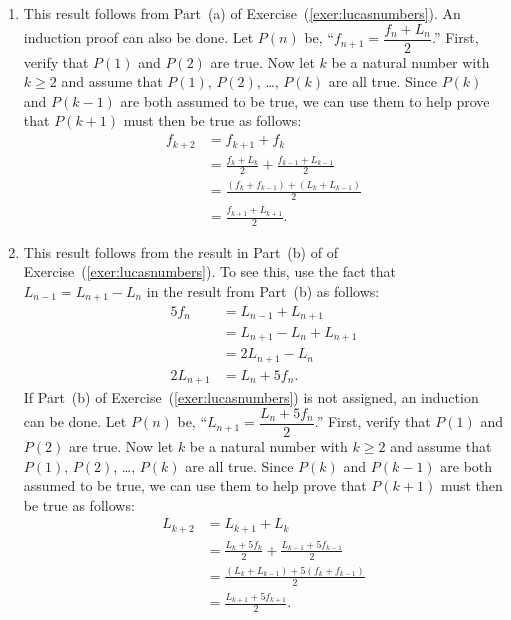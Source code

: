 \begin{enumerate}
\begin{enumerate}
\item This result follows from Part~(a) of Exercise~(\ref{exer:lucasnumbers}).  An induction proof can also be done.  Let $P(n)$ be, 
``$f_{n+1} = \dfrac{f_n + L_n}{2}$.''  First, verify that $P(1)$ and $P(2)$ are true.  Now let 
$k$ be a natural number with $k \geq 2$ and assume that $P(1)$, $P(2)$, \ldots, 
$P(k)$ are all true. Since $P(k)$ and $P(k-1)$ are both assumed to be true, we can use them to help prove that $P(k+1)$ must then be true as follows:
\begin{align*}
f_{k + 2} &= f_{k+1} + f_k \\
          &= \frac{f_k + L_k}{2} + \frac{f_{k-1} + L_{k-1}}{2} \\
          &= \frac{\left( f_k + f_{k-1} \right) + \left( L_k + L_{k-1} \right)}{2} \\
          &= \frac{f_{k+1} + L_{k+1}}{2}.
\end{align*}


\item This result follows from the result in Part~(b) of of Exercise~(\ref{exer:lucasnumbers}).  To see this, use the fact that 
$L_{n-1} = L_{n+1} - L_n$ in the result from Part~(b) as follows:
\begin{align*}
5f_n &= L_{n-1} + L_{n+1} \\
     &= L_{n+1} - L_n + L_{n+1} \\
     &= 2L_{n+1} - L_n \\
2L_{n+1} &= L_n + 5f_n.
\end{align*}
If Part~(b) of Exercise~(\ref{exer:lucasnumbers}) is not assigned, an induction can be done.  Let $P(n)$ be, 
``$L_{n+1} = \dfrac{L_n + 5f_n}{2}$.''  First, verify that $P(1)$ and $P(2)$ are true.  Now let 
$k$ be a natural number with $k \geq 2$ and assume that $P(1)$, $P(2)$, \ldots, 
$P(k)$ are all true. Since $P(k)$ and $P(k-1)$ are both assumed to be true, we can use them to help prove that $P(k+1)$ must then be true as follows:
\begin{align*}
L_{k + 2} &= L_{k+1} + L_k \\
          &= \frac{L_k + 5f_k}{2} + \frac{L_{k-1} + 5f_{k-1}}{2} \\
          &= \frac{\left( L_k + L_{k-1} \right) + 5\left( f_k + f_{k-1} \right)}{2} \\
          &= \frac{L_{k+1} + 5f_{k+1}}{2}.
\end{align*}



\end{enumerate}
\end{enumerate}
